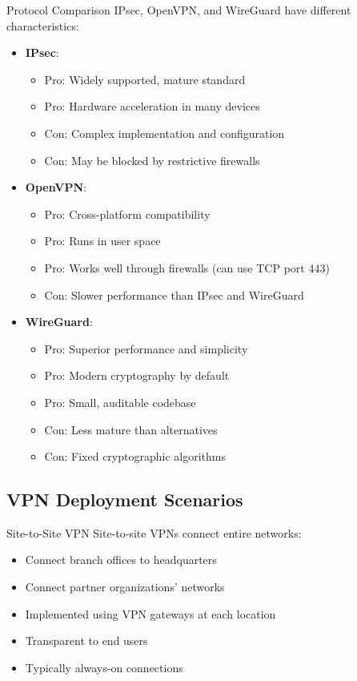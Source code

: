 \begin{concept}{Protocol Comparison}
IPsec, OpenVPN, and WireGuard have different characteristics:
\begin{itemize}
    \item \textbf{IPsec}:
    \begin{itemize}
        \item Pro: Widely supported, mature standard
        \item Pro: Hardware acceleration in many devices
        \item Con: Complex implementation and configuration
        \item Con: May be blocked by restrictive firewalls
    \end{itemize}
    \item \textbf{OpenVPN}:
    \begin{itemize}
        \item Pro: Cross-platform compatibility
        \item Pro: Runs in user space
        \item Pro: Works well through firewalls (can use TCP port 443)
        \item Con: Slower performance than IPsec and WireGuard
    \end{itemize}
    \item \textbf{WireGuard}:
    \begin{itemize}
        \item Pro: Superior performance and simplicity
        \item Pro: Modern cryptography by default
        \item Pro: Small, auditable codebase
        \item Con: Less mature than alternatives
        \item Con: Fixed cryptographic algorithms
    \end{itemize}
\end{itemize}
\end{concept}

\subsection{VPN Deployment Scenarios}

\begin{concept}{Site-to-Site VPN}
Site-to-site VPNs connect entire networks:
\begin{itemize}
    \item Connect branch offices to headquarters
    \item Connect partner organizations' networks
    \item Implemented using VPN gateways at each location
    \item Transparent to end users
    \item Typically always-on connections
\end{itemize}
\end{concept}

